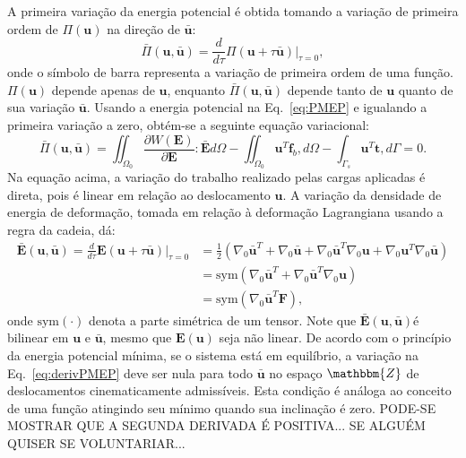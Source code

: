 A primeira variação da energia potencial é obtida tomando a variação de primeira ordem de $\Pi(\mathbf{u})$ na direção de $\mathbf{\bar{u}}$:
\begin{equation}\label{eq:derivPi}
	\bar{\Pi}(\mathbf{u}, \mathbf{\bar{u}}) = \frac{d}{d\tau} \Pi(\mathbf{u} + \tau \mathbf{\bar{u}}) \Big|_{\tau=0},
\end{equation}
onde o símbolo de barra representa a variação de primeira ordem de uma função. $\Pi(\mathbf{u})$ depende apenas de $\mathbf{u}$, enquanto $\bar{\Pi}(\mathbf{u}, \mathbf{\bar{u}})$ depende tanto de $\mathbf{u}$ quanto de sua variação $\mathbf{\bar{u}}$. Usando a energia potencial na Eq.~\eqref{eq:PMEP} e igualando a primeira variação a zero, obtém-se a seguinte equação variacional:
\begin{equation}\label{eq:derivPMEP}
	\bar{\Pi}(\mathbf{u}, \mathbf{\bar{u}}) = \iint_{\Omega_0} \frac{\partial W(\mathbf{E})}{\partial \mathbf{E}} : \mathbf{\bar{E}} d\Omega - \iint_{\Omega_0} \mathbf{u}^T \mathbf{f}_b , d\Omega - \int_{\Gamma_s} \mathbf{u}^T \mathbf{t} , d\Gamma = 0.
\end{equation}
Na equação acima, a variação do trabalho realizado pelas cargas aplicadas é direta, pois é linear em relação ao deslocamento $\mathbf{u}$. A variação da densidade de energia de deformação, tomada em relação à deformação Lagrangiana usando a regra da cadeia, dá:
\begin{equation}
	\begin{split}
		\mathbf{\bar{E}}(\mathbf{u}, \mathbf{\bar{u}}) = \frac{d}{d\tau} \mathbf{E}(\mathbf{u} + \tau \mathbf{\bar{u}}) \Big|_{\tau=0} &= \frac{1}{2} \left( \nabla_0 \mathbf{\bar{u}}^T + \nabla_0 \mathbf{\bar{u}} + \nabla_0 \mathbf{\bar{u}}^T \nabla_0 \mathbf{u}  + \nabla_0 \mathbf{u}^T \nabla_0 \mathbf{\bar{u}} \right) \\
		& =\text{sym}\left(\nabla_0\mathbf{\bar{u}}^T+ \nabla_0 \mathbf{\bar{u}}^T \nabla_0 \mathbf{u}\right)\\
		& =\text{sym}\left(\nabla_0\mathbf{\bar{u}}^T\mathbf{F}\right),
	\end{split}
\end{equation}
onde $\text{sym}(\cdot)$ denota a parte simétrica de um tensor. Note que $\mathbf{\bar{E}}(\mathbf{u}, \mathbf{\bar{u}})$é bilinear em $\mathbf{u}$ e $\mathbf{\bar{u}}$, mesmo que $\mathbf{E}(\mathbf{u})$ seja não linear. De acordo com o princípio da energia potencial mínima, se o sistema está em equilíbrio, a variação na Eq.~\eqref{eq:derivPMEP} deve ser nula para todo $\mathbf{\bar{u}}$ no espaço $\mathbbm{Z}$ de deslocamentos cinematicamente admissíveis. Esta condição é análoga ao conceito de uma função atingindo seu mínimo quando sua inclinação é zero. {\color{red}PODE-SE MOSTRAR QUE A SEGUNDA DERIVADA É POSITIVA... SE ALGUÉM QUISER SE VOLUNTARIAR...}

